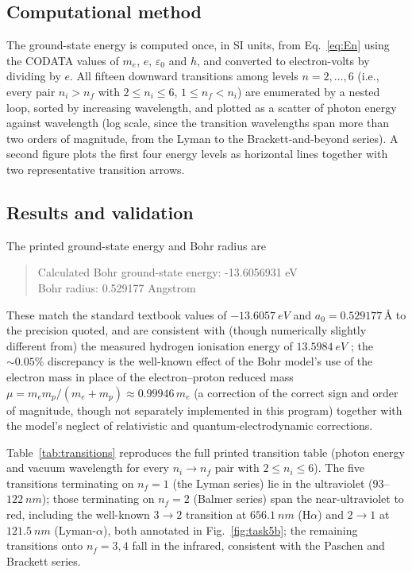 \documentclass[11pt]{article}
\begin{document}
\subsection{Computational method}
The ground-state energy is computed once, in SI units, from Eq.~\eqref{eq:En} using the CODATA values of $m_e$, $e$, $\varepsilon_0$ and $h$, and converted to electron-volts by dividing by $e$. All fifteen downward transitions among levels $n=2,\ldots,6$ (i.e., every pair $n_i>n_f$ with $2\le n_i\le6$, $1\le n_f<n_i$) are enumerated by a nested loop, sorted by increasing wavelength, and plotted as a scatter of photon energy against wavelength (log scale, since the transition wavelengths span more than two orders of magnitude, from the Lyman to the Brackett-and-beyond series). A second figure plots the first four energy levels as horizontal lines together with two representative transition arrows.

\subsection{Results and validation}
The printed ground-state energy and Bohr radius are
\begin{quote}\ttfamily
Calculated Bohr ground-state energy: -13.6056931 eV\\
Bohr radius: 0.529177 Angstrom
\end{quote}
These match the standard textbook values of $-\SI{13.6057}{eV}$ and $a_0=\num{0.529177}\,\text{\AA}$ to the precision quoted, and are consistent with (though numerically slightly different from) the measured hydrogen ionisation energy of $\SI{13.5984}{eV}$ \cite{nist_hydrogen}; the $\sim0.05\%$ discrepancy is the well-known effect of the Bohr model's use of the electron mass in place of the electron--proton reduced mass $\mu=m_em_p/(m_e+m_p)\approx0.99946\,m_e$ (a correction of the correct sign and order of magnitude, though not separately implemented in this program) together with the model's neglect of relativistic and quantum-electrodynamic corrections.

Table~\ref{tab:transitions} reproduces the full printed transition table (photon energy and vacuum wavelength for every $n_i\to n_f$ pair with $2\le n_i\le6$). The five transitions terminating on $n_f=1$ (the Lyman series) lie in the ultraviolet ($93$--$\SI{122}{nm}$); those terminating on $n_f=2$ (Balmer series) span the near-ultraviolet to red, including the well-known $3\to2$ transition at $\SI{656.1}{nm}$ (H$\alpha$) and $2\to1$ at $\SI{121.5}{nm}$ (Lyman-$\alpha$), both annotated in Fig.~\ref{fig:task5b}; the remaining transitions onto $n_f=3,4$ fall in the infrared, consistent with the Paschen and Brackett series.
\end{document}
